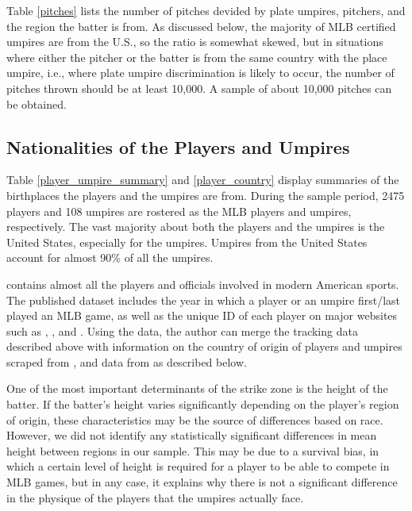 \documentclass[dvipdfmx, 12pt]{jsarticle}
\begin{document}
Table \ref{pitches} lists the number of pitches  devided by plate umpires, pitchers, and the region the batter is from. As discussed below, the majority of MLB certified umpires are from the U.S., so the ratio is somewhat skewed, but in situations where either the pitcher or the batter is from the same country with the place umpire, i.e., where plate umpire discrimination is likely to occur, the number of pitches thrown should be at least 10,000. A sample of about 10,000 pitches can be obtained.

\subsection{Nationalities of the Players and Umpires}




Table \ref{player_umpire_summary} and \ref{player_country} display summaries of the birthplaces the players and the umpires are from. During the sample period, 2475 players and 108 umpires are rostered as the MLB players and umpires, respectively. The vast majority about both the players and the umpires is the United States, especially for the umpires. Umpires from the United States account for almost 90\% of all the umpires.

\citet{chadwick} contains almost all the players and officials involved in modern American sports. The published dataset includes the year in which a player or an umpire first/last played an MLB game, as well as the unique ID of each player on major websites such as \citet{baseballsavant}, \citet{bbref}, and \citet{fg}. Using the data, the author can merge the tracking data described above with information on the country of origin of players and umpires scraped from \citet{bbref}, and data from \citet{fg} as described below.

One of the most important determinants of the strike zone is the height of the batter. If the batter's height varies significantly depending on the player's region of origin, these characteristics may be the source of differences based on race. However, we did not identify any statistically significant differences in mean height between regions in our sample. This may be due to a survival bias, in which a certain level of height is required for a player to be able to compete in MLB games, but in any case, it explains why there is not a significant difference in the physique of the players that the umpires actually face.
\end{document}
